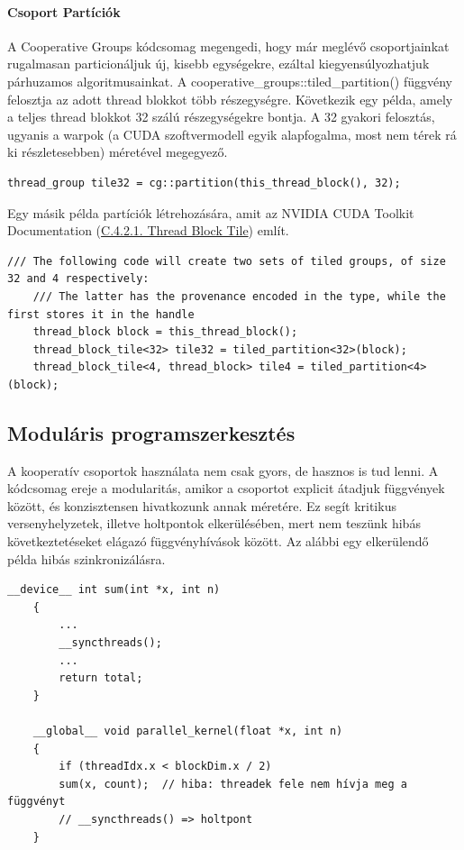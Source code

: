 \paragraph{Csoport Partíciók}
A Cooperative Groups kódcsomag megengedi, hogy már meglévő csoportjainkat rugalmasan particionáljuk új, kisebb egységekre, ezáltal kiegyensúlyozhatjuk párhuzamos algoritmusainkat. A cooperative\_groups::tiled\_partition() függvény felosztja az adott thread blokkot több részegységre. Következik egy példa, amely a teljes thread blokkot 32 szálú részegységekre bontja. A 32 gyakori felosztás, ugyanis a warpok (a CUDA szoftvermodell egyik alapfogalma, most nem térek rá ki részletesebben) méretével megegyező.
\begin{lstlisting}[style=CStyle]
	thread_group tile32 = cg::partition(this_thread_block(), 32);
\end{lstlisting}

Egy másik példa partíciók létrehozására, amit az NVIDIA CUDA Toolkit Documentation (\href{https://docs.nvidia.com/cuda/cuda-c-programming-guide/index.html#thread-block-tile-group-cg}{C.4.2.1. Thread Block Tile}) \cite{CUDAdoc_threadblockTile} említ.

\begin{lstlisting}[style=CStyle]
	/// The following code will create two sets of tiled groups, of size 32 and 4 respectively:
	/// The latter has the provenance encoded in the type, while the first stores it in the handle
	thread_block block = this_thread_block();
	thread_block_tile<32> tile32 = tiled_partition<32>(block);
	thread_block_tile<4, thread_block> tile4 = tiled_partition<4>(block);
\end{lstlisting}

\subsection{Moduláris programszerkesztés}
A kooperatív csoportok használata nem csak gyors, de hasznos is tud lenni. A kódcsomag ereje a modularitás, amikor a csoportot explicit átadjuk függvények között, és konzisztensen hivatkozunk annak méretére. Ez segít kritikus versenyhelyzetek, illetve holtpontok elkerülésében, mert nem teszünk hibás következtetéseket elágazó függvényhívások között. Az alábbi egy elkerülendő példa hibás szinkronizálásra.
\begin{lstlisting}[style=CStyle]
	__device__ int sum(int *x, int n) 
	{
		...
		__syncthreads();
		...
		return total;
	}
	
	__global__ void parallel_kernel(float *x, int n)
	{
		if (threadIdx.x < blockDim.x / 2)
		sum(x, count);  // hiba: threadek fele nem hívja meg a függvényt
		// __syncthreads() => holtpont
	}
\end{lstlisting}

